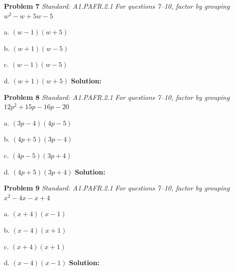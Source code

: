 \documentclass[11pt]{article}
\begin{document}
\begin{minipage}{\textwidth}
\noindent\textbf{Problem 7}
\hfill\textit{\color{gray}Standard: A1.PAFR.2.1}
\vspace{0.3em}
\noindent\textit{For questions 7–10, factor by grouping}
\vspace{0.3em}
\noindent $w^{2} - w + 5w - 5$

\quad a. $(w - 1)(w + 5)$

\quad b. $(w + 1)(w - 5)$

\quad c. $(w - 1)(w - 5)$

\quad d. $(w + 1)(w + 5)$
\vspace{0.5em}
\noindent\textbf{Solution:} 
\end{minipage}
\vspace{1.5em}
\hrulefill
\vspace{1.5em}

\begin{minipage}{\textwidth}
\noindent\textbf{Problem 8}
\hfill\textit{\color{gray}Standard: A1.PAFR.2.1}
\vspace{0.3em}
\noindent\textit{For questions 7–10, factor by grouping}
\vspace{0.3em}
\noindent $12p^{2} + 15p - 16p - 20$

\quad a. $(3p - 4)(4p - 5)$

\quad b. $(4p + 5)(3p - 4)$

\quad c. $(4p - 5)(3p + 4)$

\quad d. $(4p + 5)(3p + 4)$
\vspace{0.5em}
\noindent\textbf{Solution:} 
\end{minipage}
\vspace{1.5em}
\hrulefill
\vspace{1.5em}

\begin{minipage}{\textwidth}
\noindent\textbf{Problem 9}
\hfill\textit{\color{gray}Standard: A1.PAFR.2.1}
\vspace{0.3em}
\noindent\textit{For questions 7–10, factor by grouping}
\vspace{0.3em}
\noindent $x^{2} - 4x - x + 4$

\quad a. $(x + 4)(x - 1)$

\quad b. $(x - 4)(x + 1)$

\quad c. $(x + 4)(x + 1)$

\quad d. $(x - 4)(x - 1)$
\vspace{0.5em}
\noindent\textbf{Solution:} 
\end{minipage}
\vspace{1.5em}
\hrulefill
\vspace{1.5em}
\end{document}
